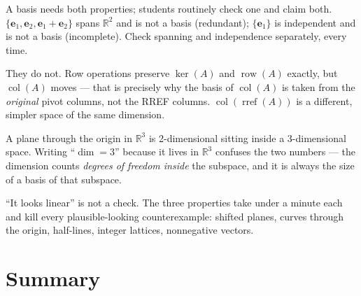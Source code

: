 \begin{tripwire}
A basis needs both properties; students routinely check one and claim both. $\{\mathbf{e}_1,\mathbf{e}_2,\mathbf{e}_1+\mathbf{e}_2\}$ spans $\mathbb{R}^2$ and is not a basis (redundant); $\{\mathbf{e}_1\}$ is independent and is not a basis (incomplete). Check spanning and independence separately, every time.
\end{tripwire}
\begin{tripwire}
They do not. Row operations preserve $\ker(A)$ and $\operatorname{row}(A)$ exactly, but $\operatorname{col}(A)$ moves — that is precisely why the basis of $\operatorname{col}(A)$ is taken from the \emph{original} pivot columns, not the RREF columns. $\operatorname{col}(\operatorname{rref}(A))$ is a different, simpler space of the same dimension.
\end{tripwire}
\begin{tripwire}
A plane through the origin in $\mathbb{R}^3$ is 2-dimensional sitting inside a 3-dimensional space. Writing ``$\dim = 3$'' because it lives in $\mathbb{R}^3$ confuses the two numbers — the dimension counts \emph{degrees of freedom inside} the subspace, and it is always the size of a basis of that subspace.
\end{tripwire}
\begin{tripwire}
``It looks linear'' is not a check. The three properties take under a minute each and kill every plausible-looking counterexample: shifted planes, curves through the origin, half-lines, integer lattices, nonnegative vectors.
\end{tripwire}

\section{Summary}\label{sec:ch3summary}

